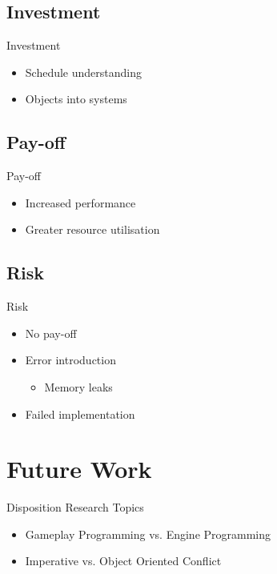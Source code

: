 \subsection{Investment}
\begin{frame}{\secname}{\subsecname}
	Investment
	\begin{itemize}
		\item<2-> Schedule understanding
		\item<3-> Objects into systems
	\end{itemize}
\end{frame}

\subsection{Pay-off}
\begin{frame}{\secname}{\subsecname}
	Pay-off
	\begin{itemize}
		\item<2-> Increased performance
		\item<3-> Greater resource utilisation
	\end{itemize}
\end{frame}

\subsection{Risk}
\begin{frame}{\secname}{\subsecname}
	Risk
	\begin{itemize}
		\item<2-> No pay-off
		\item<3-> Error introduction
		\begin{itemize}
			\item<4-> Memory leaks
		\end{itemize}
		\item<5-> Failed implementation
	\end{itemize}
\end{frame}

\section{Future Work}
\begin{frame}{\secname}{Disposition}
	Research Topics
	\begin{itemize}
		\item Gameplay Programming vs. Engine Programming
		\item Imperative vs. Object Oriented Conflict
	\end{itemize}
\end{frame}

